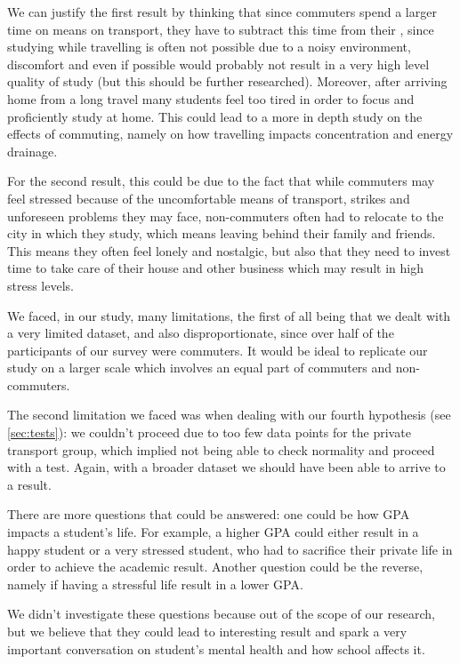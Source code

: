 \documentclass[11pt]{extarticle}
\numberwithin{table}{section}
\numberwithin{figure}{section}
\numberwithin{equation}{section}
\begin{document}
We can justify the first result by thinking that since commuters spend a larger time on
means on transport, they have to subtract this time from their ,
since studying while travelling is often not possible due to a noisy environment,
discomfort and even if possible would probably not result in a very high level quality of study
(but this should be further researched).
Moreover, after arriving home from a long travel many students feel too tired in order to focus
and proficiently study at home.
This could lead to a more in depth study on the effects of commuting,
namely on how travelling impacts concentration and energy drainage.

For the second result, this could be due to the fact that while commuters may feel stressed
because of the uncomfortable means of transport, strikes and unforeseen problems they may face,
non-commuters often had to relocate to the city in which they study,
which means leaving behind their family and friends.
This means they often feel lonely and nostalgic, but also that they need to invest time
to take care of their house and other business which may result in high stress levels.

We faced, in our study, many limitations, the first of all being that we dealt with
a very limited dataset, and also disproportionate, since over half of the participants
of our survey were commuters.
It would be ideal to replicate our study on a larger scale which involves an equal part
of commuters and non-commuters.

The second limitation we faced was when dealing with our fourth hypothesis (see \cref{sec:tests}):
we couldn’t proceed due to too few data points for the private transport group,
which implied not being able to check normality and proceed with a test.
Again, with a broader dataset we should have been able to arrive to a result.

There are more questions that could be answered: one could be how GPA impacts a student’s life.
For example, a higher GPA could either result in a happy student or a very stressed student,
who had to sacrifice their private life in order to achieve the academic result.
Another question could be the reverse, namely if having a stressful life result in a lower GPA.

We didn’t investigate these questions because out of the scope of our research,
but we believe that they could lead to interesting result and spark a very important conversation
on student’s mental health and how school affects it.
\end{document}
